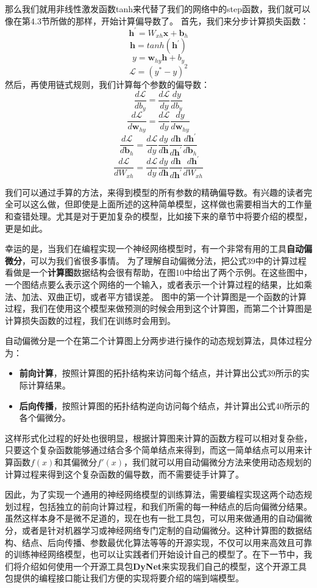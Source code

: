 \documentclass[10pt,a4paper]{ctexart}
\begin{document}
那么我们就用非线性激发函数tanh来代替了我们的网络中的step函数，我们就可以像在第4.3节所做的那样，开始计算偏导数了。
首先，我们来分步计算损失函数：
\[
 \textbf{h}^{'} = W_{xh}\textbf{x} + \textbf{b}_h
\]
\[
 \textbf{h} = tanh(\textbf{h}^{'})
\]
\[
 y = \textbf{w}_{hy} \textbf{h} + b_y
\]
\[
 \mathcal{L} = (y^* - y)^2
\]
然后，再使用链式规则，我们计算每个参数的偏导数：
\[
 \frac{d\mathcal{L}}{db_y} = \frac{d\mathcal{L}}{dy} \frac{dy}{db_y}
\]
\[
 \frac{d\mathcal{L}}{d\textbf{w}_{hy}} = \frac{d\mathcal{L}}{dy} \frac{dy}{d\textbf{w}_{hy}}
\]
\[
 \frac{d\mathcal{L}}{d\textbf{b}_h} = \frac{d\mathcal{L}}{dy} \frac{dy}{d\textbf{h}} \frac{d\textbf{h}}{d\textbf{h}^{'}} \frac{d\textbf{h}^{'}}{d\textbf{b}_h}
\]
\[
 \frac{d\mathcal{L}}{dW_{xh}} = \frac{d\mathcal{L}}{dy} \frac{dy}{d\textbf{h}} \frac{d\textbf{h}}{d\textbf{h}^{'}} \frac{d\textbf{h}^{'}}{dW_{xh}}
\]

我们可以通过手算的方法，来得到模型的所有参数的精确偏导数。有兴趣的读者完全可以这么做，但即使是上面所述的这种简单模型，这样做也需要相当大的工作量和查错处理。尤其是对于更加复杂的模型，比如接下来的章节中将要介绍的模型，更是如此。

幸运的是，当我们在编程实现一个神经网络模型时，有一个非常有用的工具\textbf{自动偏微分}，可以为我们省很多事情。
为了理解自动偏微分法，把公式39中的计算过程看做是一个\textbf{计算图}数据结构会很有帮助，在图10中给出了两个示例。在这些图中，一个图结点要么表示这个网络的一个输入，或者表示一个计算过程的结果，比如乘法、加法、双曲正切，或者平方错误差。
图中的第一个计算图是一个函数的计算过程，我们在使用这个模型来做预测的时候会用到这个计算图，而第二个计算图是计算损失函数的过程，我们在训练时会用到。

自动偏微分是一个在第二个计算图上分两步进行操作的动态规划算法，具体过程分为：
\begin{itemize}
\item \textbf{前向计算}，按照计算图的拓扑结构来访问每个结点，并计算出公式39所示的实际计算结果。
\item \textbf{后向传播}，按照计算图的拓扑结构逆向访问每个结点，并计算出公式40所示的各个偏微分。
\end{itemize}
这样形式化过程的好处也很明显，根据计算图来计算的函数方程可以相对复杂些，只要这个复杂函数能够通过结合多个简单结点来得到，而这一简单结点可以用来计算函数$f(x)$和其偏微分$f'(x)$，我们就可以用自动偏微分方法来使用动态规划的计算过程来得到这个复杂函数的偏导数，而不需要徒手计算了。

因此，为了实现一个通用的神经网络模型的训练算法，需要编程实现这两个动态规划过程，包括独立的前向计算过程，和我们所需的每一种结点的后向偏微分结果。虽然这样本身不是微不足道的，现在也有一批工具包，可以用来做通用的自动偏微分，或者是针对机器学习或神经网络专门定制的自动偏微分。这种计算图的数据结构、结点、后向传播、参数最优化算法等等的开源实现，不仅可以用来高效且可靠的训练神经网络模型，也可以让实践者们开始设计自己的模型了。在下一节中，我们将介绍如何使用一个开源工具包\textbf{DyNet}来实现我们自己的模型，这个开源工具包提供的编程接口能让我们方便的实现将要介绍的端到端模型。
\end{document}
